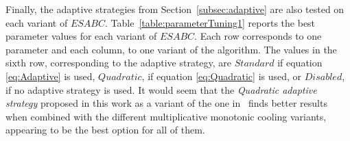 \documentclass[icae]{iosart2x}
\newcommand{\reviewed}[1]{#1} %
\begin{document}
\begin{table}[tb]
\small
\centering
\caption{\label{table:SAparameterTuning} \reviewed{Range of parameter values for each seasonal strategy.}}
\end{table}

Finally, the adaptive strategies from Section~\ref{subsec:adaptive} are also tested on each variant of $ESABC$. \reviewed{Table~\ref{table:parameterTuning1} reports the best parameter values for each variant of $ESABC$. Each row corresponds to one parameter and each column, to one variant of the algorithm. The values in the sixth row, corresponding to the adaptive strategy, are $Standard$ if equation \eqref{eq:Adaptive} is used, $Quadratic$, if equation \eqref{eq:Quadratic} is used, or $Disabled$, if no adaptive strategy is used}. It would seem that the \textit{Quadratic adaptive strategy} proposed in this work as a variant of the one in~\cite{Locatelli2000} finds better results when combined with the different multiplicative monotonic cooling variants, appearing to be the best option for all of them.
\end{document}
